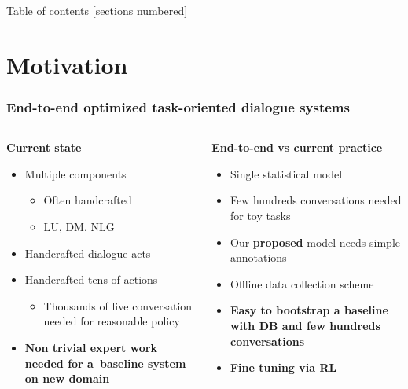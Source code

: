\documentclass[10pt, compress,british,xcolor={svgnames,dvipsnames,x11names},trans]{beamer}
\begin{document}
\begin{frame}{Table of contents}
  [sections numbered]
  \tableofcontents[hideallsubsections]
\end{frame}


\section{Motivation}  %

\begin{frame}\frametitle{End-to-end optimized task-oriented dialogue systems}
\begin{columns}
\begin{column}{0.45\textwidth}
    {\bf Current state} \\
    \begin{itemize}
        \item Multiple components
            \begin{itemize}
                \item Often handcrafted
                \item LU, DM, NLG 
            \end{itemize}
        \item Handcrafted dialogue acts
        \item Handcrafted tens of actions
            \begin{itemize}
                \item Thousands of live conversation needed for reasonable policy~\cite{gasic_line_2011}
            \end{itemize}
        \item {\bf \color{red} Non trivial expert work needed for a~baseline system on new domain}
    \end{itemize}
\end{column}
\begin{column}{0.45\textwidth}
    {\bf End-to-end vs current practice}
    \begin{itemize}
        \item Single statistical model
        \item Few hundreds conversations needed for toy tasks~\cite{wen_networkbased_2016}
        \item Our {\bf proposed} model needs simple annotations
        \item {\color{darkgreen} Offline data collection scheme}~\cite{wen_networkbased_2016,platek2016wochat}
        \item {\bf \color{darkgreen} Easy to bootstrap a baseline with DB and few hundreds conversations}
        \item {\bf \color{darkgreen} Fine tuning via RL}
    \end{itemize}
\end{column}
\end{columns}
\end{frame}
\end{document}
